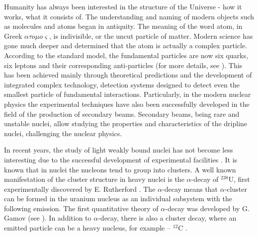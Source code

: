 \documentclass[
12pt, %
oneside, %
english, %
doublespacing, %
doublespacing, %
toctotoc, %
parskip, %
headsepline, %
]{MastersDoctoralThesis} %
\begin{document}
Humanity has always been interested in the structure of the Universe - how it works, what it consists of. 
The understanding and naming of modern objects such as molecules and atoms began in antiquity.
 The meaning of the word atom, in Greek $\alpha \tau o \mu o \varsigma$, is indivisible, or the uncut particle of matter. 
 Modern science has gone much deeper and determined that the atom is actually a complex particle. 
 According to the standard model, the fundamental particles are now six quarks, six leptons and their corresponding anti-particles (for more details, see \cite{donoghue2014dynamics, griffiths2020introduction, ramond1999journeys}).  
This has been achieved mainly through theoretical predictions and the development of integrated complex technology, detection systems designed to detect even the smallest particle of fundamental interactions.
Particularly, in the modern nuclear physics the experimental techniques have also been successfully developed in the field of the production of secondary beams. 
Secondary beams, being rare and unstable nuclei, allow studying the properties and characteristics of the dripline nuclei, challenging the nuclear physics.

In recent years, the study of light weakly bound nuclei  has not become less interesting due to the successful development of experimental facilities \cite{ter2004radioactive, yano2007riken, gade2016nscl, hong2014plan, fukuda2013identification}. 
It is known that in nuclei the nucleons tend to group into clusters. 
A well known manifestation of the cluster structure in heavy nuclei is the $\alpha$-decay of $^{238}$U, first experimentally discovered by E. Rutherford \cite{rutherford1899viii}. 
The $\alpha$-decay means that $\alpha$-cluster can be formed in the uranium nucleus as an individual  subsystem with the following emission.
The first quantitative theory of  $\alpha$-decay was developed by G. Gamov (see \cite{stuewer1986gamow}). In addition to $\alpha$-decay, there is also a cluster decay, where an emitted particle can be a heavy nucleus, for example -- $ ^ {12}$C \cite{poenaru2012cluster}.
\end{document}
